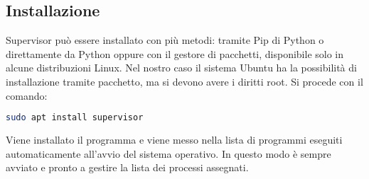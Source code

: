 \subsection{Installazione}
\label{subsec:client-supervisor-installazione}
Supervisor può essere installato con più metodi: 
tramite Pip di Python o direttamente da Python oppure con il gestore di pacchetti, disponibile solo in alcune distribuzioni Linux.
Nel nostro caso il sistema Ubuntu ha la possibilità di installazione tramite pacchetto, ma si devono avere i diritti root.
Si procede con il comando:
\begin{lstlisting}[language=bash]
	sudo apt install supervisor
\end{lstlisting}
Viene installato il programma e viene messo nella lista di programmi eseguiti automaticamente all'avvio del sistema operativo.
In questo modo è sempre avviato e pronto a gestire la lista dei processi assegnati.


